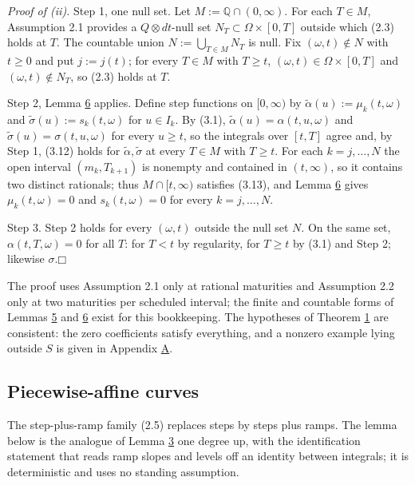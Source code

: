 \documentclass[11pt]{article}
\providecommand{\square}{\mdlgwhtsquare}
\begin{document}
\emph{Proof of (ii).} Step 1, one null set. Let \(M := \mathbb Q \cap (0, \infty)\). For each \(T \in M\), Assumption 2.1 provides a \(Q \otimes dt\)-null set \(N_T \subset \Omega \times [0, T]\) outside which (2.3) holds at \(T\). The countable union \(N := \bigcup_{T \in M} N_T\) is null. Fix \((\omega, t) \notin N\) with \(t \ge 0\) and put \(j := j(t)\); for every \(T \in M\) with \(T \ge t\), \((\omega, t) \in \Omega \times [0, T]\) and \((\omega, t) \notin N_T\), so (2.3) holds at \(T\).

Step 2, Lemma \hyperref[res:Lemma-6]{6} applies. Define step functions on \([0, \infty)\) by \(\tilde\alpha(u) := \mu_k(t, \omega)\) and \(\tilde\sigma(u) := s_k(t, \omega)\) for \(u \in I_k\). By (3.1), \(\tilde\alpha(u) = \alpha(t, u, \omega)\) and \(\tilde\sigma(u) = \sigma(t, u, \omega)\) for every \(u \ge t\), so the integrals over \([t, T]\) agree and, by Step 1, (3.12) holds for \(\tilde\alpha, \tilde\sigma\) at every \(T \in M\) with \(T \ge t\). For each \(k = j, \dots, N\) the open interval \((m_k, T_{k+1})\) is nonempty and contained in \((t, \infty)\), so it contains two distinct rationals; thus \(M \cap [t, \infty)\) satisfies (3.13), and Lemma \hyperref[res:Lemma-6]{6} gives \(\mu_k(t, \omega) = 0\) and \(s_k(t, \omega) = 0\) for every \(k = j, \dots, N\).

Step 3. Step 2 holds for every \((\omega, t)\) outside the null set \(N\). On the same set, \(\alpha(t, T, \omega) = 0\) for all \(T\): for \(T < t\) by regularity, for \(T \ge t\) by (3.1) and Step 2; likewise \(\sigma\).\hfill$\square$

The proof uses Assumption 2.1 only at rational maturities and Assumption 2.2 only at two maturities per scheduled interval; the finite and countable forms of Lemmas \hyperref[res:Lemma-5]{5} and \hyperref[res:Lemma-6]{6} exist for this bookkeeping. The hypotheses of Theorem \hyperref[res:Theorem-1]{1} are consistent: the zero coefficients satisfy everything, and a nonzero example lying outside \(S\) is given in Appendix \hyperref[sec:A]{A}.

\subsection{Piecewise-affine curves}\label{sec:3.4}

The step-plus-ramp family (2.5) replaces steps by steps plus ramps. The lemma below is the analogue of Lemma \hyperref[res:Lemma-3]{3} one degree up, with the identification statement that reads ramp slopes and levels off an identity between integrals; it is deterministic and uses no standing assumption.
\end{document}

